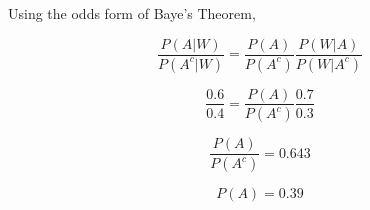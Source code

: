 Using the odds form of Baye's Theorem,

$$\frac{P(A|W)}{P(A^{c}|W)} = \frac{P(A)}{P(A^{c})} \frac{P(W|A)}{P(W|A^{c})}$$

$$\frac{0.6}{0.4} = \frac{P(A)}{P(A^{c})} \frac{0.7}{0.3}$$

$$\frac{P(A)}{P(A^{c})} = 0.643$$

$$P(A) = 0.39$$
